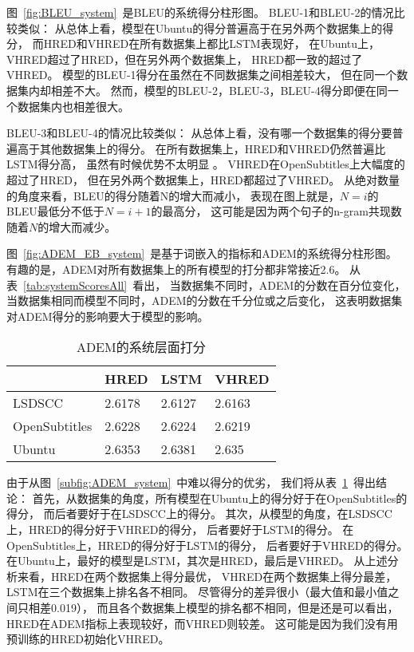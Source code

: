 
图~\ref{fig:BLEU_system}~是BLEU的系统得分柱形图。
BLEU-1和BLEU-2的情况比较类似：
从总体上看，模型在Ubuntu的得分普遍高于在另外两个数据集上的得分，
而HRED和VHRED在所有数据集上都比LSTM表现好，
在Ubuntu上，VHRED超过了HRED，但在另外两个数据集上，
HRED都一致的超过了VHRED。
模型的BLEU-1得分在虽然在不同数据集之间相差较大，
但在同一个数据集内却相差不大。
然而，模型的BLEU-2，BLEU-3，BLEU-4得分即便在同一个数据集内也相差很大。

BLEU-3和BLEU-4的情况比较类似：
从总体上看，没有哪一个数据集的得分要普遍高于其他数据集上的得分。
在所有数据集上，HRED和VHRED仍然普遍比LSTM得分高，
虽然有时候优势不太明显 。
VHRED在OpenSubtitles上大幅度的超过了HRED，
但在另外两个数据集上，HRED都超过了VHRED。
从绝对数量的角度来看，BLEU的得分随着N的增大而减小，
表现在图上就是，$N = i$的BLEU最低分不低于$N = i + 1$的最高分，
这可能是因为两个句子的n-gram共现数随着$N$的增大而减少。


图~\ref{fig:ADEM_EB_system}~是基于词嵌入的指标和ADEM的系统得分柱形图。
有趣的是，ADEM对所有数据集上的所有模型的打分都非常接近2.6。
从表~\ref{tab:systemScoresAll}~看出，
当数据集不同时，ADEM的分数在百分位变化，
当数据集相同而模型不同时，ADEM的分数在千分位或之后变化，
这表明数据集对ADEM得分的影响要大于模型的影响。
\begin{table}[H]
    \centering
    \caption{ADEM的系统层面打分}
    \label{tab:ADEM_system}
    \begin{tabular}{llll}
        \toprule
        & HRED & LSTM & VHRED \\
        \midrule
        LSDSCC & 2.6178 & 2.6127 & 2.6163  \\
        OpenSubtitles & 2.6228 & 2.6224 & 2.6219 \\
        Ubuntu & 2.6353 & 2.6381 & 2.635 \\
        \bottomrule
    \end{tabular}
\end{table}
由于从图~\ref{subfig:ADEM_system}~中难以得分的优劣，
我们将从表~\ref{tab:ADEM_system}~得出结论：
首先，从数据集的角度，所有模型在Ubuntu上的得分好于在OpenSubtitles的得分，
而后者要好于在LSDSCC上的得分。
其次，从模型的角度，在LSDSCC上，HRED的得分好于VHRED的得分，
后者要好于LSTM的得分。
在OpenSubtitles上，HRED的得分好于LSTM的得分，
后者要好于VHRED的得分。
在Ubuntu上，最好的模型是LSTM，其次是HRED，最后是VHRED。
从上述分析来看，HRED在两个数据集上得分最优，
VHRED在两个数据集上得分最差，
LSTM在三个数据集上排名各不相同。
尽管得分的差异很小（最大值和最小值之间只相差0.019），
而且各个数据集上模型的排名都不相同，但是还是可以看出，
HRED在ADEM指标上表现较好，而VHRED则较差。
这可能是因为我们没有用预训练的HRED初始化VHRED。

